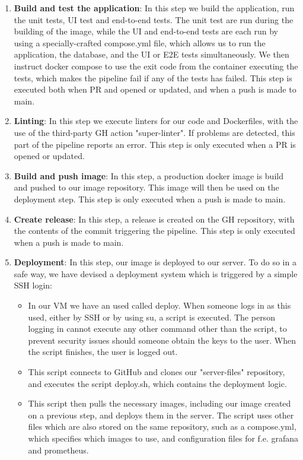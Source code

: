 \begin{enumerate}
	\item \textbf{Build and test the application}: In this step we build the application, run the unit tests, UI test and end-to-end tests. The unit test are run during the building of the image, while the UI and end-to-end tests are each run by using a specially-crafted compose.yml file, which allows us to run the application, the database, and the UI or E2E tests simultaneously. We then instruct docker compose to use the exit code from the container executing the tests, which makes the pipeline fail if any of the tests has failed. This step is executed both when PR and opened or updated, and when a push is made to main.
	\item \textbf{Linting}: In this step we execute linters for our code and Dockerfiles, with the use of the third-party GH action "super-linter". If problems are detected, this part of the pipeline reports an error. This step is only executed when a PR is opened or updated.
	\item \textbf{Build and push image}: In this step, a production docker image is build and pushed to our image repository. This image will then be used on the deployment step. This step is only executed when a push is made to main. 
	\item \textbf{Create release}: In this step, a release is created on the GH repository, with the contents of the commit triggering the pipeline. This step is only executed when a push is made to main. 
	\item \textbf{Deployment}: In this step, our image is deployed to our server. To do so in a safe way, we have devised a deployment system which is triggered by a simple SSH login:
	\begin{itemize}
		\item In our VM we have an used called deploy. When someone logs in as this used, either by SSH or by using su, a script is executed. The person logging in cannot execute any other command other than the script, to prevent security issues should someone obtain the keys to the user. When the script finishes, the user is logged out.
		\item This script connects to GitHub and clones our "server-files" repository, and executes the script deploy.sh, which contains the deployment logic.
		\item This script then pulls the necessary images, including our image created on a previous step, and deploys them in the server. The script uses other files which are also stored on the same repository, such as a compose.yml, which specifies which images to use, and configuration files for f.e. grafana and prometheus.

\end{itemize}
\end{enumerate}
